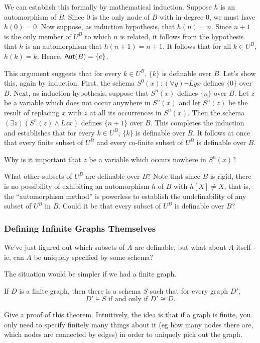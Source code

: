 We can establish this formally by mathematical induction. Suppose $h$ is an automorphism of $B$. Since $0$ is the only node of $B$ with in-degree $0$, we must have $h(0)=0$. Now suppose, as induction hypothesis, that $h(n)=n$. Since $n+1$ is the only member of $U^B$ to which $n$ is related, it follows from the hypothesis that $h$ is an automorphism that $h(n+1)=n+1$. It follows that for all $k\in U^B$, $h(k)=k$. Hence, $\mbox{$\mathsf{Aut}(B)$}=\{e\}$. 

This argument suggests that for every $k\in U^B$, $\{k\}$ is definable over $B$. Let's show this, again by induction. First, the schema $S^0(x): (\forall y)\neg Lyx$ defines $\{0\}$ over $B$. Next, as induction hypothesis, suppose that $S^n(x)$ defines $\{n\}$ over $B$. Let $z$ be a variable which does not occur anywhere in $S^n(x)$ and let $S^n(z)$ be the result of replacing $x$ with $z$ at all its occurrences in $S^n(x)$. Then the schema $(\exists z)(S^n(z)\wedge Lzx)$ defines $\{n+1\}$ over $B$. This completes the induction and establishes that for every $k\in U^B$, $\{k\}$ is definable over $B$. It follows at once that every finite subset of $U^B$ and every co-finite subset of $U^B$ is definable over $B$. 

\begin{aside}
    Why is it important that $z$ be a variable which occurs nowhere in $S^n(x)$?
\end{aside}

What other subsets of $U^B$ are definable over $B$? Note that since $B$ is rigid, there is no possibility of exhibiting an automorphism $h$ of $B$ with $h[X]\neq X$, that is, the ``automorphism method'' is powerless to establish the undefinability of any subset of $U^B$ in $B$. Could it be that every subset of $U^B$ is definable over $B$? 
\iffalse
\subsubsection*{Defining Infinite Graphs Themselves}
We've just figured out which subsets of $A$ are definable, but what about $A$ itself - ie, can $A$ be uniquely specified by some schema?

The situation would be simpler if we had a finite graph.
\begin{theorem}
If $D$ is a finite graph, then there is a schema $S$ such that for every graph $D'$, 
\[
D'\models S \mbox{ if and only if } D'\cong D.
\]
\end{theorem}

\begin{aside}
    Give a proof of this theorem. Intuitively, the idea is that if a graph is finite, you only need to specify finitely many things about it (eg how many nodes there are, which nodes are connected by edges) in order to uniquely pick out the graph. 
\end{aside}

